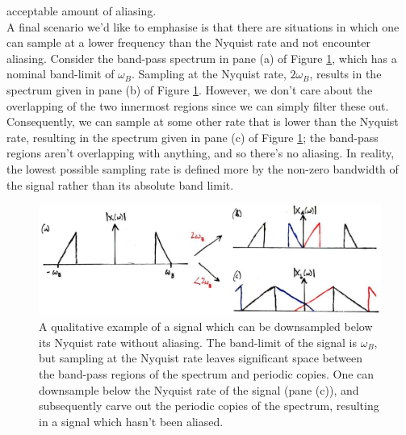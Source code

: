 acceptable amount of aliasing.\\
%
A final scenario we'd like to emphasise is that there are situations in which one can
sample at a lower frequency than the Nyquist rate and not encounter aliasing. Consider
the band-pass spectrum in pane (a) of Figure \ref{fig::lecture_14_undersample},
which has a nominal band-limit of
$\omega_B$. Sampling at the Nyquist rate, $2\omega_B$, results in the spectrum given
in pane (b) of Figure \ref{fig::lecture_14_undersample}. However, we don't care about the
overlapping of the
two innermost regions since we can simply filter these out. Consequently, we can sample
at some other rate that is lower than the Nyquist rate, resulting in the spectrum
given in pane (c) of Figure \ref{fig::lecture_14_undersample}; the band-pass regions aren't
overlapping with anything,
and so there's no aliasing. In reality, the lowest possible sampling rate is defined more
by the non-zero bandwidth of the signal rather than its absolute band limit.
%
\begin{figure}[!htb]
  \includegraphics[width=\textwidth]{images/lecture_14_undersample.JPG}
  \caption{A qualitative example of a signal which can be downsampled below
    its Nyquist rate without aliasing. The band-limit of the signal is $\omega_B$,
    but sampling at the Nyquist rate leaves significant space between the band-pass
    regions of the spectrum and periodic copies. One can downsample below the
    Nyquist rate of the signal (pane (c)), and subsequently carve out the
    periodic copies of the spectrum, resulting in a signal which hasn't been aliased.
  }
  \label{fig::lecture_14_undersample}
\end{figure}
%


